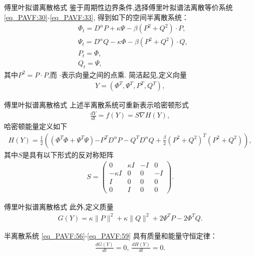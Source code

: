\documentclass[aspectratio=169]{beamer}
\numberwithin{theorem}{section} %
\numberwithin{equation}{section}%
\numberwithin{figure}{section}%
\numberwithin{table}{section}%
\begin{document}
\begin{frame}{傅里叶拟谱离散格式}
	鉴于周期性边界条件,选择傅里叶拟谱法离散等价系统 \eqref{eq_PAVF:30}-\eqref{eq_PAVF:33},
	得到如下的空间半离散系统：
	{\color{purple}\begin{align}
	&\varPhi_{t}=D^{\alpha}P+\kappa \Psi-\beta \left( P^{2}+Q^{2}\right)\cdot P,\label{eq_PAVF:56}\\
	&\Psi_{t}=D^{\alpha}Q-\kappa \varPhi-\beta \left( P^{2}+Q^{2}\right)\cdot Q,\label{eq_PAVF:57}\\
	&P_t=\varPhi,\label{eq_PAVF:58}\\
	&Q_t=\Psi,\label{eq_PAVF:59}
	\end{align}}
	其中$P^{2}=P \cdot P$,而 $\cdot$表示向量之间的点乘.
	简洁起见,定义向量
\begin{align}\label{eq_PAVF:60a}
Y=\left(\varPhi^{T}, \Psi^{T}, P^{T}, Q^{T}\right),
\end{align}
\end{frame}
\begin{frame}{傅里叶拟谱离散格式}
	上述半离散系统可重新表示哈密顿形式
	{\color{purple}\begin{align}\label{eq_PAVF:60}
	\frac{d Y}{d t}=f(Y)=S \nabla H(Y),
	\end{align}}
	哈密顿能量定义如下
	\begin{align}\label{eq_PAVF:61}
		H(Y)=\frac{1}{2}\left((\varPhi^{T}\varPhi+\Psi^{T}\Psi){-P^{T} D^{\alpha} P-Q^{T} D^{\alpha} Q}+\frac{\beta}{2}(P^2+Q^2)^{T}(P^2+Q^2)\right),
	\end{align}
	其中$S$是具有以下形式的反对称矩阵
	\begin{align}\label{eq_PAVF:62}
	S=\left(\begin{array}{cccc}
	0 & \kappa I & -I & 0 \\
	-\kappa I & 0 & 0 & -I \\
	I & 0 & 0 & 0 \\
	0 & I & 0 & 0
	\end{array}\right).
	\end{align}
	
\end{frame}
\begin{frame}{傅里叶拟谱离散格式}
	此外,定义质量
	\begin{align}\label{eq_PAVF:63}
	G(Y)=\kappa\|P\|^{2}+\kappa\|Q\|^{2} +2\Psi^{T}P-2\varPhi^{T}Q.
	\end{align}
	
\begin{theorem}	\label{thm_PAVF:3}
	半离散系统 \eqref{eq_PAVF:56}-\eqref{eq_PAVF:59} 具有质量和能量守恒定律：
\begin{align}
\frac{d G(Y)}{d t}=0,~\frac{d H(Y)}{d t}=0.
\end{align}
\end{theorem} 
\end{frame}
\end{document}
